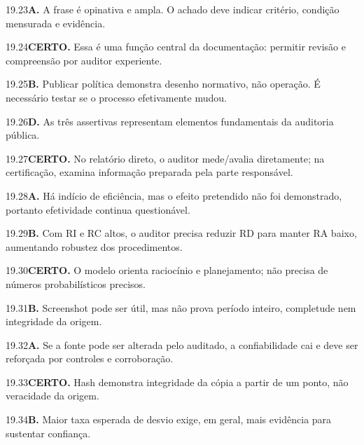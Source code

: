 \begin{solucao}{19.23}\textbf{A.} A frase é opinativa e ampla. O achado deve indicar critério, condição mensurada e evidência.\end{solucao}
\begin{solucao}{19.24}\textbf{CERTO.} Essa é uma função central da documentação: permitir revisão e compreensão por auditor experiente.\end{solucao}
\begin{solucao}{19.25}\textbf{B.} Publicar política demonstra desenho normativo, não operação. É necessário testar se o processo efetivamente mudou.\end{solucao}

\begin{solucao}{19.26}\textbf{D.} As três assertivas representam elementos fundamentais da auditoria pública.\end{solucao}
\begin{solucao}{19.27}\textbf{CERTO.} No relatório direto, o auditor mede/avalia diretamente; na certificação, examina informação preparada pela parte responsável.\end{solucao}
\begin{solucao}{19.28}\textbf{A.} Há indício de eficiência, mas o efeito pretendido não foi demonstrado, portanto efetividade continua questionável.\end{solucao}
\begin{solucao}{19.29}\textbf{B.} Com RI e RC altos, o auditor precisa reduzir RD para manter RA baixo, aumentando robustez dos procedimentos.\end{solucao}
\begin{solucao}{19.30}\textbf{CERTO.} O modelo orienta raciocínio e planejamento; não precisa de números probabilísticos precisos.\end{solucao}
\begin{solucao}{19.31}\textbf{B.} Screenshot pode ser útil, mas não prova período inteiro, completude nem integridade da origem.\end{solucao}
\begin{solucao}{19.32}\textbf{A.} Se a fonte pode ser alterada pelo auditado, a confiabilidade cai e deve ser reforçada por controles e corroboração.\end{solucao}
\begin{solucao}{19.33}\textbf{CERTO.} Hash demonstra integridade da cópia a partir de um ponto, não veracidade da origem.\end{solucao}
\begin{solucao}{19.34}\textbf{B.} Maior taxa esperada de desvio exige, em geral, mais evidência para sustentar confiança.\end{solucao}
